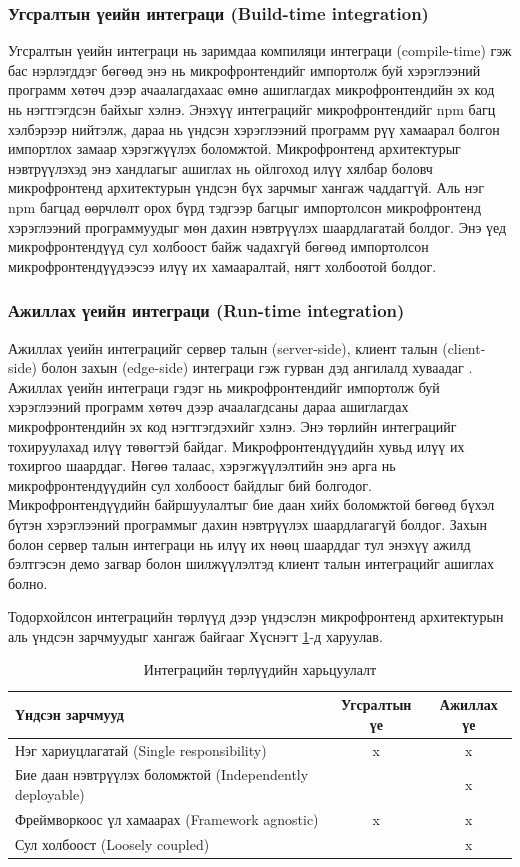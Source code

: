 \subsubsection{Угсралтын үеийн интеграци (Build-time integration)}
\hspace*{0.6cm}Угсралтын үеийн интеграци нь заримдаа компиляци интеграци (compile-time) гэж бас нэрлэгддэг бөгөөд энэ нь микрофронтендийг импортолж буй хэрэглээний программ хөтөч дээр ачаалагдахаас өмнө ашиглагдах микрофронтендийн эх код нь нэгтгэгдсэн байхыг хэлнэ. Энэхүү интеграцийг микрофронтендийг npm багц хэлбэрээр нийтэлж, дараа нь үндсэн хэрэглээний программ рүү хамаарал болгон импортлох замаар хэрэгжүүлэх боломжтой. Микрофронтенд архитектурыг нэвтрүүлэхэд энэ хандлагыг ашиглах нь ойлгоход илүү хялбар боловч микрофронтенд архитектурын үндсэн бүх зарчмыг хангаж чаддаггүй. Аль нэг npm багцад өөрчлөлт орох бүрд тэдгээр багцыг импортолсон микрофронтенд хэрэглээний программуудыг мөн дахин нэвтрүүлэх шаардлагатай болдог. Энэ үед микрофронтендүүд сул холбоост байж чадахгүй бөгөөд импортолсон микрофронтендүүдээсээ илүү их хамааралтай, нягт холбоотой болдог.
\subsubsection{Ажиллах үеийн интеграци (Run-time integration)}
\hspace*{0.6cm}Ажиллах үеийн интеграцийг сервер талын (server-side), клиент талын (client-side) болон захын (edge-side) интеграци гэж гурван дэд ангилалд хуваадаг \cite{microfrontends_info}. Ажиллах үеийн интеграци гэдэг нь микрофронтендийг импортолж буй хэрэглээний программ хөтөч дээр ачаалагдсаны дараа ашиглагдах микрофронтендийн эх код нэгтгэгдэхийг хэлнэ. Энэ төрлийн интеграцийг тохируулахад илүү төвөгтэй байдаг. Микрофронтендүүдийн хувьд илүү их тохиргоо шаарддаг. Нөгөө талаас, хэрэгжүүлэлтийн энэ арга нь микрофронтендүүдийн сул холбоост байдлыг бий болгодог. Микрофронтендүүдийн байршуулалтыг бие даан хийх боломжтой бөгөөд бүхэл бүтэн хэрэглээний программыг дахин нэвтрүүлэх шаардлагагүй болдог. Захын болон сервер талын интеграци нь илүү их нөөц шаарддаг тул энэхүү ажилд бэлтгэсэн демо загвар болон шилжүүлэлтэд клиент талын интеграцийг ашиглах болно.

Тодорхойлсон интеграцийн төрлүүд дээр үндэслэн микрофронтенд архитектурын аль үндсэн зарчмуудыг хангаж байгааг Хүснэгт \ref{tab:integration_types}-д харуулав. 
\begin{table}[H]
\centering
\caption{Интеграцийн төрлүүдийн харьцуулалт}
\label{tab:integration_types}
\renewcommand{\arraystretch}{1}
\begin{tabular}{lcc}
\toprule
\textbf{Үндсэн зарчмууд} & \textbf{Угсралтын үе} & \textbf{Ажиллах үе} \\
\midrule
Нэг хариуцлагатай (Single responsibility) & x & x \\
Бие даан нэвтрүүлэх боломжтой (Independently deployable) & & x \\
Фреймворкоос үл хамаарах (Framework agnostic) & x & x \\
Сул холбоост (Loosely coupled) & & x \\
\bottomrule
\end{tabular}
\end{table}

